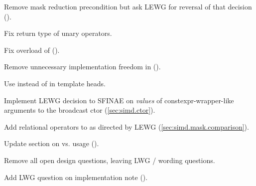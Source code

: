 \begin{revision}
\item Remove mask reduction precondition but ask LEWG for reversal of that decision ().
\item Fix return type of \mask unary operators.
\item Fix  overload of \simdselect ().
\item Remove unnecessary implementation freedom in  ().
\item Use  instead of  in template heads.
\item Implement LEWG decision to SFINAE on \emph{values} of
  constexpr-wrapper-like arguments to the broadcast ctor (\ref{sec:simd.ctor}).
\item Add relational operators to \mask as directed by LEWG (\ref{sec:simd.mask.comparison}).
\item Update section on  vs.  usage ().
\item Remove all open design questions, leaving LWG / wording questions.
\item Add LWG question on implementation note ().
\end{revision}
